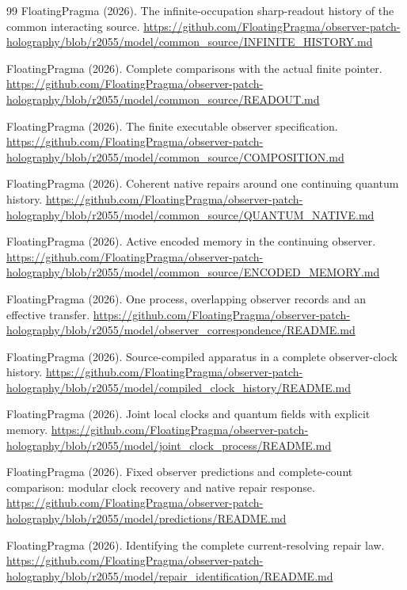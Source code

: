 \documentclass[11pt]{article}
\theoremstyle{definition}
\theoremstyle{remark}
\begin{document}
{\begin{thebibliography}{99}
FloatingPragma (2026). The infinite-occupation sharp-readout history of the
common interacting source.
\url{https://github.com/FloatingPragma/observer-patch-holography/blob/r2055/model/common_source/INFINITE_HISTORY.md}

FloatingPragma (2026). Complete comparisons with the actual finite pointer.
\url{https://github.com/FloatingPragma/observer-patch-holography/blob/r2055/model/common_source/READOUT.md}

FloatingPragma (2026). The finite executable observer specification.
\url{https://github.com/FloatingPragma/observer-patch-holography/blob/r2055/model/common_source/COMPOSITION.md}

FloatingPragma (2026). Coherent native repairs around one continuing quantum history.
\url{https://github.com/FloatingPragma/observer-patch-holography/blob/r2055/model/common_source/QUANTUM_NATIVE.md}

FloatingPragma (2026). Active encoded memory in the continuing observer.
\url{https://github.com/FloatingPragma/observer-patch-holography/blob/r2055/model/common_source/ENCODED_MEMORY.md}

FloatingPragma (2026). One process, overlapping observer records and an
effective transfer.
\url{https://github.com/FloatingPragma/observer-patch-holography/blob/r2055/model/observer_correspondence/README.md}

FloatingPragma (2026). Source-compiled apparatus in a complete
observer-clock history.
\url{https://github.com/FloatingPragma/observer-patch-holography/blob/r2055/model/compiled_clock_history/README.md}

FloatingPragma (2026). Joint local clocks and quantum fields with explicit
memory.
\url{https://github.com/FloatingPragma/observer-patch-holography/blob/r2055/model/joint_clock_process/README.md}

FloatingPragma (2026). Fixed observer predictions and complete-count
comparison: modular clock recovery and native repair response.
\url{https://github.com/FloatingPragma/observer-patch-holography/blob/r2055/model/predictions/README.md}

FloatingPragma (2026). Identifying the complete current-resolving repair
law.
\url{https://github.com/FloatingPragma/observer-patch-holography/blob/r2055/model/repair_identification/README.md}


\end{thebibliography}}
\end{document}
